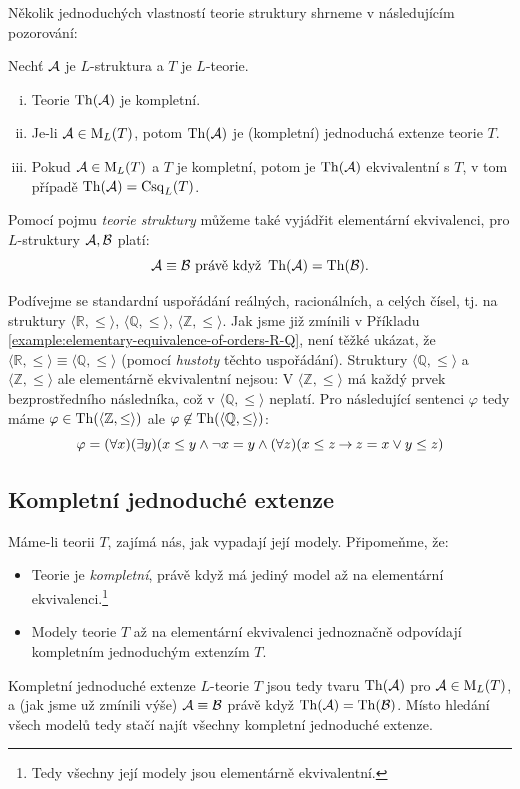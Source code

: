 Několik jednoduchých vlastností teorie struktury shrneme v následujícím pozorování:

\begin{observation}
    Nechť $\mathcal{A}$ je $L$-struktura a $T$ je $L$-teorie.
    \begin{enumerate}[(i)]
        \item Teorie $\operatorname{Th}(\mathcal{A})$ je kompletní.
        \item Je-li $\mathcal{A}\in\operatorname{M}_L(T)$, potom $\operatorname{Th}(\mathcal{A})$ je (kompletní) jednoduchá extenze teorie $T$.
        \item Pokud $\mathcal{A}\in\operatorname{M}_L(T)$ a $T$ je kompletní, potom je $\operatorname{Th}(\mathcal{A})$ ekvivalentní s $T$, v tom případě $\operatorname{Th}(\mathcal{A})=\operatorname{Csq}_L(T)$.
        
    \end{enumerate}    
\end{observation}

Pomocí pojmu \emph{teorie struktury} můžeme také vyjádřit elementární ekvivalenci, pro $L$-struktury $\mathcal{A},\mathcal{B}$ platí:
$$
\mathcal{A}\equiv\mathcal{B} \text{ právě když }\operatorname{Th}(\mathcal{A})=\operatorname{Th}(\mathcal{B}).
$$

\begin{example}
   Podívejme se standardní uspořádání reálných, racionálních, a celých čísel, tj. na struktury $\langle\mathbb R,\leq\rangle$, $\langle\mathbb Q,\leq\rangle$, $\langle\mathbb Z,\leq\rangle$. Jak jsme již zmínili v Příkladu \ref{example:elementary-equivalence-of-orders-R-Q}, není těžké ukázat, že $\langle\mathbb R,\leq\rangle\equiv\langle\mathbb Q,\leq\rangle$ (pomocí \emph{hustoty} těchto uspořádání). Struktury $\langle\mathbb Q,\leq\rangle$ a $\langle\mathbb Z,\leq\rangle$ ale elementárně ekvivalentní nejsou: V $\langle\mathbb Z,\leq\rangle$ má každý prvek bezprostředního následníka, což v $\langle\mathbb Q,\leq\rangle$ neplatí. Pro následující sentenci $\varphi$ tedy máme $\varphi\in\operatorname{Th}(\langle\mathbb Z,\leq\rangle)$ ale $\varphi\not\in\operatorname{Th}(\langle\mathbb Q,\leq\rangle)$:
   $$
   \varphi=(\forall x)(\exists y)(x\leq y\land \neg x=y\land(\forall z)(x\leq z\mathbin{\rightarrow} z=x\lor y\leq z)
   $$
\end{example}


\subsection{Kompletní jednoduché extenze}

Máme-li teorii $T$, zajímá nás, jak vypadají její modely. Připomeňme, že:
\begin{itemize}
    \item Teorie je \emph{kompletní}, právě když má jediný model až na elementární ekvivalenci.\footnote{Tedy všechny její modely jsou elementárně ekvivalentní.}
    \item Modely teorie $T$ až na elementární ekvivalenci jednoznačně odpovídají kompletním jednoduchým extenzím $T$.
\end{itemize}
Kompletní jednoduché extenze $L$-teorie $T$ jsou tedy tvaru $\operatorname{Th}(\mathcal{A})$ pro $\mathcal{A}\in\operatorname{M}_L(T)$, a (jak jsme už zmínili výše) $\mathcal{A}\equiv\mathcal{B}$ právě když $\operatorname{Th}(\mathcal{A})=\operatorname{Th}(\mathcal{B})$. Místo hledání všech modelů tedy stačí najít všechny kompletní jednoduché extenze.

